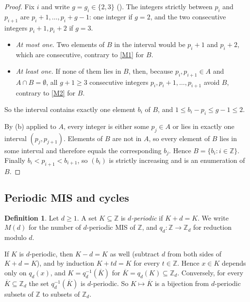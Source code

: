 \documentclass[11pt]{article}
\theoremstyle{plain}
\theoremstyle{definition}
\newtheorem{definition}[definition]{Definition}
\theoremstyle{remark}
\newcommand{\Z}{\mathbb{Z}}
\begin{document}
\begin{proof}
Fix $i$ and write $g = g_i \in \{2, 3\}$ (). The integers strictly between
$p_i$ and $p_{i+1}$ are $p_i + 1, \dots, p_i + g - 1$: one integer if $g = 2$, and the two
consecutive integers $p_i + 1, p_i + 2$ if $g = 3$.
\begin{itemize}
  \item \emph{At most one.} Two elements of $B$ in the interval would be $p_i + 1$ and
        $p_i + 2$, which are consecutive, contrary to \ref{M1} for $B$.
  \item \emph{At least one.} If none of them lies in $B$, then, because $p_i, p_{i+1} \in A$
        and $A \cap B = \emptyset$, all $g + 1 \ge 3$ consecutive integers
        $p_i, p_i + 1, \dots, p_{i+1}$ avoid $B$, contrary to \ref{M2} for $B$.
\end{itemize}
So the interval contains exactly one element $b_i$ of $B$, and
$1 \le b_i - p_i \le g - 1 \le 2$.

By (b) applied to $A$, every integer is either some $p_j \in A$ or lies in
exactly one interval $(p_j, p_{j+1})$. Elements of $B$ are not in $A$, so every element of $B$
lies in some interval and therefore equals the corresponding $b_j$. Hence
$B = \{b_i : i \in \Z\}$. Finally $b_i < p_{i+1} < b_{i+1}$, so $(b_i)$ is strictly
increasing and is an enumeration of $B$.
\end{proof}

\subsection{Periodic MIS and cycles}

\begin{definition}\label{def:periodic}
Let $d \ge 1$. A set $K \subseteq \Z$ is \emph{$d$-periodic} if $K + d = K$. We write $M(d)$
for the number of $d$-periodic MIS of $\Z$, and $q_d : \Z \to \Z_d$ for reduction modulo $d$.
\end{definition}

If $K$ is $d$-periodic, then $K - d = K$ as well (subtract $d$ from both sides of
$K + d = K$), and by induction $K + td = K$ for every $t \in \Z$. Hence $x \in K$ depends only
on $q_d(x)$, and $K = q_d^{-1}(\overline{K})$ for $\overline{K} = q_d(K) \subseteq \Z_d$.
Conversely, for every $\overline{K} \subseteq \Z_d$ the set $q_d^{-1}(\overline{K})$ is
$d$-periodic. So $K \mapsto \overline{K}$ is a bijection from $d$-periodic subsets of $\Z$ to
subsets of $\Z_d$.
\end{document}
